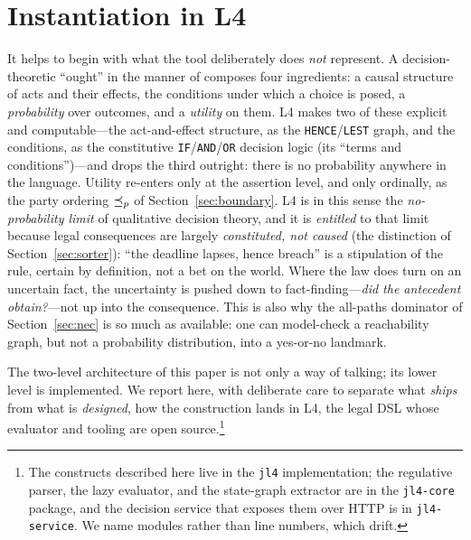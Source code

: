
\section{Instantiation in L4}
\label{sec:tooling}

It helps to begin with what the tool deliberately does \emph{not} represent. A
decision-theoretic ``ought'' in the manner of  composes four ingredients: a
causal structure of acts and their effects, the conditions under which a choice is posed, a
\emph{probability} over outcomes, and a \emph{utility} on them. L4 makes two of these
explicit and computable---the act-and-effect structure, as the \texttt{HENCE}/\texttt{LEST}
graph, and the conditions, as the constitutive \texttt{IF}/\texttt{AND}/\texttt{OR} decision
logic (its ``terms and conditions'')---and drops the third outright: there is no probability
anywhere in the language. Utility re-enters only at the assertion level, and only ordinally,
as the party ordering $\preceq_{p}$ of Section~\ref{sec:boundary}. L4 is in this sense the
\emph{no-probability limit} of qualitative decision theory, and it is \emph{entitled} to
that limit because legal consequences are largely \emph{constituted, not caused} (the
distinction of Section~\ref{sec:sorter}): ``the deadline lapses, hence breach'' is a
stipulation of the rule, certain by definition, not a bet on the world. Where the law does
turn on an uncertain fact, the uncertainty is pushed down to fact-finding---\emph{did the
antecedent obtain?}---not up into the consequence. This is also why the all-paths dominator
of Section~\ref{sec:nec} is so much as available: one can model-check a reachability graph,
but not a probability distribution, into a yes-or-no landmark.

The two-level architecture of this paper is not only a way of talking; its lower level is
implemented. We report here, with deliberate care to separate what \emph{ships} from what
is \emph{designed}, how the construction lands in L4, the legal DSL whose evaluator and
tooling are open source.\footnote{The constructs described here live in the \texttt{jl4}
implementation; the regulative parser, the lazy evaluator, and the state-graph extractor
are in the \texttt{jl4-core} package, and the decision service that exposes them over HTTP
is in \texttt{jl4-service}. We name modules rather than line numbers, which drift.}

